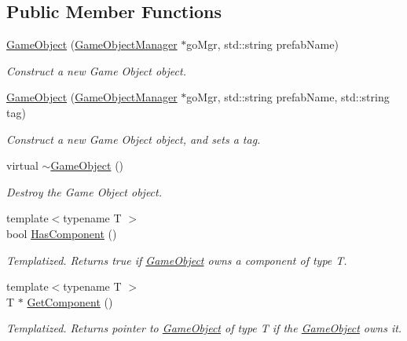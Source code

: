 \subsection*{Public Member Functions}
\begin{DoxyCompactItemize}
\item 
\hyperlink{classGameObject_aada17b22194b4188379d8d7d56f87bc2}{Game\+Object} (\hyperlink{classGameObjectManager}{Game\+Object\+Manager} $\ast$go\+Mgr, std\+::string prefab\+Name)
\begin{DoxyCompactList}\small\item\em Construct a new Game Object object. \end{DoxyCompactList}\item 
\hyperlink{classGameObject_a40bdca26a41d7266495ad380169f8376}{Game\+Object} (\hyperlink{classGameObjectManager}{Game\+Object\+Manager} $\ast$go\+Mgr, std\+::string prefab\+Name, std\+::string tag)
\begin{DoxyCompactList}\small\item\em Construct a new Game Object object, and sets a tag. \end{DoxyCompactList}\item 
\mbox{\label{classGameObject_ab82dfdb656f9051c0587e6593b2dda97}} 
virtual \hyperlink{classGameObject_ab82dfdb656f9051c0587e6593b2dda97}{$\sim$\+Game\+Object} ()
\begin{DoxyCompactList}\small\item\em Destroy the Game Object object. \end{DoxyCompactList}\item 
{\footnotesize template$<$typename T $>$ }\\bool \hyperlink{classGameObject_ace5e8a7bdb6bf548b534cae696ed0db1}{Has\+Component} ()
\begin{DoxyCompactList}\small\item\em Templatized. Returns true if \hyperlink{classGameObject}{Game\+Object} owns a component of type T. \end{DoxyCompactList}\item 
{\footnotesize template$<$typename T $>$ }\\T $\ast$ \hyperlink{classGameObject_a5ba3b458e6bee6ea5aedd5c8cdeabf18}{Get\+Component} ()
\begin{DoxyCompactList}\small\item\em Templatized. Returns pointer to \hyperlink{classGameObject}{Game\+Object} of type T if the \hyperlink{classGameObject}{Game\+Object} owns it. \end{DoxyCompactList}\item 

\end{DoxyCompactItemize}
